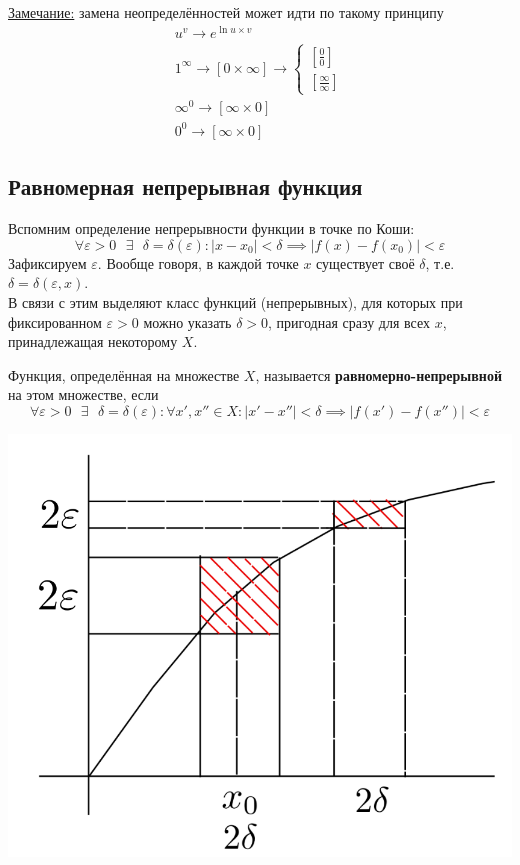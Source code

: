 \documentclass[12pt]{article}
\let\ORIincludegraphics\includegraphics
\renewcommand{\includegraphics}[2][]{\ORIincludegraphics[scale=0.65,#1]{#2}}
\begin{document}
    \underline{Замечание:} замена неопределённостей может идти по такому принципу
    \begin{gather*}
        u^v \to e^{\ln u \times v}\\
        1^\infty \to \left[0 \times \infty\right] \to \begin{cases}
            \left[\frac{0}{0}\right]\\
            \left[\frac{\infty}{\infty}\right]
        \end{cases}\\
        \infty^0 \to \left[\infty \times 0\right]\\
        0^0 \to \left[\infty \times 0\right]
    \end{gather*}

    \subsection{Равномерная непрерывная функция}\noindent
    Вспомним определение непрерывности функции в точке по Коши:
    \[ \forall \varepsilon > 0 \text{ } \exists \text{ } \delta = \delta(\varepsilon) : |x - x_0| < \delta \implies |f(x) - f(x_0)| < \varepsilon \]
    Зафиксируем $\varepsilon$. Вообще говоря, в каждой точке $x$ существует своё $\delta$, т.е. $\delta = \delta(\varepsilon, x)$.\\
    В связи с этим выделяют класс функций (непрерывных), для которых при фиксированном $\varepsilon > 0$ можно указать $\delta > 0$, пригодная сразу для всех $x$, принадлежащая некоторому $X$.\par\noindent
    Функция, определённая на множестве $X$, называется \textbf{равномерно-непрерывной} на этом множестве, если
    \[ \forall \varepsilon > 0 \text{ } \exists \text{ } \delta = \delta(\varepsilon) : \forall x', x'' \in X : |x' - x''| < \delta \implies |f(x') - f(x'')| < \varepsilon \]
    \begin{center}
        \includegraphics[scale=0.4]{3.9.1.png}
    \end{center}
\end{document}

